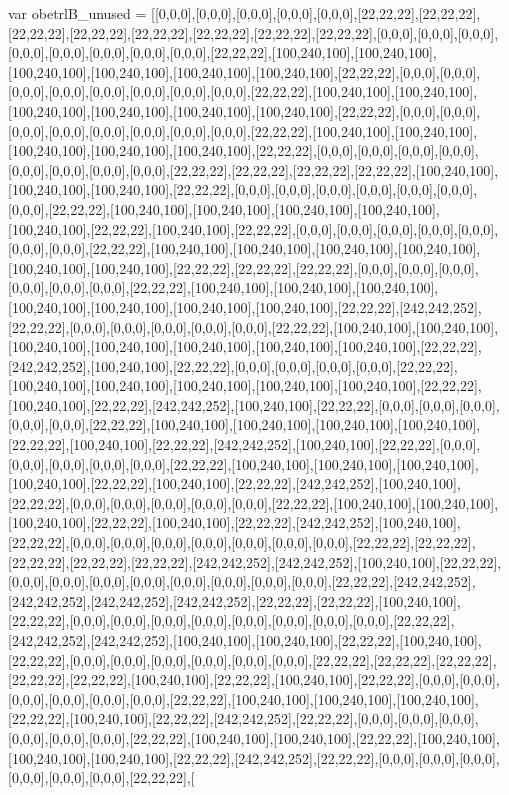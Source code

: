 var obetrlB_unused = [[0,0,0],[0,0,0],[0,0,0],[0,0,0],[0,0,0],[22,22,22],[22,22,22],[22,22,22],[22,22,22],[22,22,22],[22,22,22],[22,22,22],[22,22,22],[0,0,0],[0,0,0],[0,0,0],[0,0,0],[0,0,0],[0,0,0],[0,0,0],[0,0,0],[22,22,22],[100,240,100],[100,240,100],[100,240,100],[100,240,100],[100,240,100],[100,240,100],[22,22,22],[0,0,0],[0,0,0],[0,0,0],[0,0,0],[0,0,0],[0,0,0],[0,0,0],[0,0,0],[22,22,22],[100,240,100],[100,240,100],[100,240,100],[100,240,100],[100,240,100],[100,240,100],[22,22,22],[0,0,0],[0,0,0],[0,0,0],[0,0,0],[0,0,0],[0,0,0],[0,0,0],[0,0,0],[22,22,22],[100,240,100],[100,240,100],[100,240,100],[100,240,100],[100,240,100],[22,22,22],[0,0,0],[0,0,0],[0,0,0],[0,0,0],[0,0,0],[0,0,0],[0,0,0],[0,0,0],[22,22,22],[22,22,22],[22,22,22],[22,22,22],[100,240,100],[100,240,100],[100,240,100],[22,22,22],[0,0,0],[0,0,0],[0,0,0],[0,0,0],[0,0,0],[0,0,0],[0,0,0],[22,22,22],[100,240,100],[100,240,100],[100,240,100],[100,240,100],[100,240,100],[22,22,22],[100,240,100],[22,22,22],[0,0,0],[0,0,0],[0,0,0],[0,0,0],[0,0,0],[0,0,0],[0,0,0],[22,22,22],[100,240,100],[100,240,100],[100,240,100],[100,240,100],[100,240,100],[100,240,100],[22,22,22],[22,22,22],[22,22,22],[0,0,0],[0,0,0],[0,0,0],[0,0,0],[0,0,0],[0,0,0],[22,22,22],[100,240,100],[100,240,100],[100,240,100],[100,240,100],[100,240,100],[100,240,100],[100,240,100],[22,22,22],[242,242,252],[22,22,22],[0,0,0],[0,0,0],[0,0,0],[0,0,0],[0,0,0],[22,22,22],[100,240,100],[100,240,100],[100,240,100],[100,240,100],[100,240,100],[100,240,100],[100,240,100],[22,22,22],[242,242,252],[100,240,100],[22,22,22],[0,0,0],[0,0,0],[0,0,0],[0,0,0],[22,22,22],[100,240,100],[100,240,100],[100,240,100],[100,240,100],[100,240,100],[22,22,22],[100,240,100],[22,22,22],[242,242,252],[100,240,100],[22,22,22],[0,0,0],[0,0,0],[0,0,0],[0,0,0],[0,0,0],[22,22,22],[100,240,100],[100,240,100],[100,240,100],[100,240,100],[22,22,22],[100,240,100],[22,22,22],[242,242,252],[100,240,100],[22,22,22],[0,0,0],[0,0,0],[0,0,0],[0,0,0],[0,0,0],[22,22,22],[100,240,100],[100,240,100],[100,240,100],[100,240,100],[22,22,22],[100,240,100],[22,22,22],[242,242,252],[100,240,100],[22,22,22],[0,0,0],[0,0,0],[0,0,0],[0,0,0],[0,0,0],[22,22,22],[100,240,100],[100,240,100],[100,240,100],[22,22,22],[100,240,100],[22,22,22],[242,242,252],[100,240,100],[22,22,22],[0,0,0],[0,0,0],[0,0,0],[0,0,0],[0,0,0],[0,0,0],[0,0,0],[22,22,22],[22,22,22],[22,22,22],[22,22,22],[22,22,22],[242,242,252],[242,242,252],[100,240,100],[22,22,22],[0,0,0],[0,0,0],[0,0,0],[0,0,0],[0,0,0],[0,0,0],[0,0,0],[0,0,0],[22,22,22],[242,242,252],[242,242,252],[242,242,252],[242,242,252],[22,22,22],[22,22,22],[100,240,100],[22,22,22],[0,0,0],[0,0,0],[0,0,0],[0,0,0],[0,0,0],[0,0,0],[0,0,0],[0,0,0],[22,22,22],[242,242,252],[242,242,252],[100,240,100],[100,240,100],[22,22,22],[100,240,100],[22,22,22],[0,0,0],[0,0,0],[0,0,0],[0,0,0],[0,0,0],[0,0,0],[22,22,22],[22,22,22],[22,22,22],[22,22,22],[22,22,22],[100,240,100],[22,22,22],[100,240,100],[22,22,22],[0,0,0],[0,0,0],[0,0,0],[0,0,0],[0,0,0],[0,0,0],[22,22,22],[100,240,100],[100,240,100],[100,240,100],[22,22,22],[100,240,100],[22,22,22],[242,242,252],[22,22,22],[0,0,0],[0,0,0],[0,0,0],[0,0,0],[0,0,0],[0,0,0],[22,22,22],[100,240,100],[100,240,100],[22,22,22],[100,240,100],[100,240,100],[100,240,100],[22,22,22],[242,242,252],[22,22,22],[0,0,0],[0,0,0],[0,0,0],[0,0,0],[0,0,0],[0,0,0],[22,22,22],[